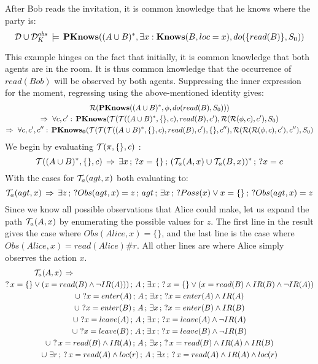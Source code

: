 \begin{example}
After Bob reads the invitation, it is common knowledge that he knows
where the party is:\[
\mathcal{D}\cup\mathcal{D}_{K}^{obs}\,\models\,\mathbf{PKnows}((A\cup B)^{*},\exists x:\mathbf{Knows}(B,loc=x),do(\{read(B)\},S_{0}))\]

\end{example}
This example hinges on the fact that initially, it is common knowledge
that both agents are in the room. It is thus common knowledge that
the occurrence of $read(Bob)$ will be observed by both agents. Suppressing
the inner expression for the moment, regressing using the above-mentioned
identity gives:\begin{multline*}
\mathcal{R}(\mathbf{PKnows}((A\cup B)^{*},\phi,do(read(B),S_{0})))\\
\Rightarrow\,\,\forall c,c':\,\mathbf{PKnows}(\mathcal{T}(\mathcal{T}((A\cup B)^{*},\{\},c),read(B),c'),\mathcal{R}(\mathcal{R}(\phi,c),c'),S_{0})\\
\Rightarrow\,\,\forall c,c',c'':\,\mathbf{PKnows_{0}}(\mathcal{T}(\mathcal{T}(\mathcal{T}((A\cup B)^{*},\{\},c),read(B),c'),\{\},c''),\mathcal{R}(\mathcal{R}(\mathcal{R}(\phi,c),c'),c''),S_{0})\end{multline*}
 We begin by evaluating $\mathcal{T}(\pi,\{\},c)$ :\[
\mathcal{T}((A\cup B)^{*},\{\},c)\,\Rightarrow\,\exists x\,;\,?x=\{\}\,;\,(\mathcal{T}_{a}(A,x)\cup\mathcal{T}_{a}(B,x))^{*}\,;\,?x=c\]
 With the cases for $\mathcal{T}_{a}(agt,x)$ both evaluating to:\[
\mathcal{T}_{a}(agt,x)\,\Rightarrow\,\exists z\,;\,?Obs(agt,x)=z\,;\, agt\,;\,\exists x\,;\,?Poss(x)\vee x=\{\}\,;\,?Obs(agt,x)=z\]
 Since we know all possible observations that Alice could make, let
us expand the path $\mathcal{T}_{a}(A,x)$ by enumerating the possible values
for $z$. The first line in the result gives the case where $Obs(Alice,x)=\{\}$,
and the last line is the case where $Obs(Alice,x)=read(Alice)\#r$.
All other lines are where Alice simply observes the action $x$. \begin{gather*}
\mathcal{T}_{a}(A,x)\,\Rightarrow\,\,\,\,\,\,\,\,\,\,\,\,\,\,\,\,\,\,\,\,\,\,\,\,\,\,\,\,\,\,\,\,\,\,\,\,\,\,\,\,\,\,\,\,\,\,\,\,\,\,\,\,\,\,\,\,\,\,\,\,\,\,\,\,\,\,\,\,\,\,\,\,\,\,\,\,\,\,\,\,\,\,\,\,\,\,\,\,\,\,\,\,\,\,\,\,\,\,\,\,\,\,\,\,\,\,\,\,\,\,\,\,\,\,\,\,\,\,\,\,\,\,\,\,\,\,\,\,\,\,\,\,\,\,\,\,\,\,\,\,\,\,\,\,\,\,\,\,\,\,\,\,\,\,\,\,\,\,\,\,\,\,\,\\
?\, x=\{\}\vee(x=read(B)\wedge\neg IR(A)))\,;\, A\,;\,\exists x\,;\,?\, x=\{\}\vee(x=read(B)\wedge IR(B)\wedge\neg IR(A))\\
\cup\,\,?x=enter(A)\,;\, A\,;\,\exists x\,;\,?x=enter(A)\wedge IR(A)\\
\cup\,\,?x=enter(B)\,;\, A\,;\,\exists x\,;\,?x=enter(B)\wedge IR(B)\\
\cup\,\,?x=leave(A)\,;\, A\,;\,\exists x\,;\,?x=leave(A)\wedge\neg IR(A)\\
\cup\,\,?x=leave(B)\,;\, A\,;\,\exists x\,;\,?x=leave(B)\wedge\neg IR(B)\\
\cup\,\,?\, x=read(B)\wedge IR(A)\,;\, A\,;\,\exists x\,;\,?\, x=read(B)\wedge IR(A)\wedge IR(B)\\
\cup\,\,\exists r\,;\,?\, x=read(A)\wedge loc(r)\,;\, A\,;\,\exists x\,;\,?\, x=read(A)\wedge IR(A)\wedge loc(r)\end{gather*}
